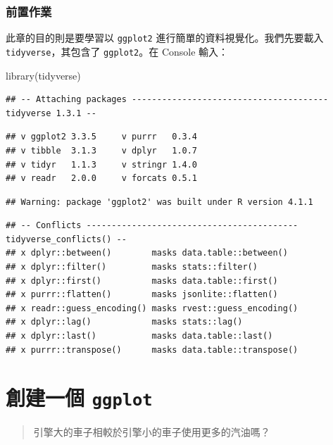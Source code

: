 \documentclass[
]{book}
\newenvironment{Shaded}{\begin{snugshade}}{\end{snugshade}}
\newcommand{\FunctionTok}[1]{\textcolor[rgb]{0.00,0.00,0.00}{#1}}
\newcommand{\NormalTok}[1]{#1}
\theoremstyle{definition}
\theoremstyle{remark}
\begin{document}
\hypertarget{ux524dux7f6eux4f5cux696d}{%
\subsubsection*{前置作業}\label{ux524dux7f6eux4f5cux696d}}

此章的目的則是要學習以 \texttt{ggplot2} 進行簡單的資料視覺化。我們先要載入 \texttt{tidyverse}，其包含了 \texttt{ggplot2}。在 Console 輸入：

\begin{Shaded}
\begin{Highlighting}[]
\FunctionTok{library}\NormalTok{(tidyverse)}
\end{Highlighting}
\end{Shaded}

\begin{verbatim}
## -- Attaching packages --------------------------------------- tidyverse 1.3.1 --
\end{verbatim}

\begin{verbatim}
## v ggplot2 3.3.5     v purrr   0.3.4
## v tibble  3.1.3     v dplyr   1.0.7
## v tidyr   1.1.3     v stringr 1.4.0
## v readr   2.0.0     v forcats 0.5.1
\end{verbatim}

\begin{verbatim}
## Warning: package 'ggplot2' was built under R version 4.1.1
\end{verbatim}

\begin{verbatim}
## -- Conflicts ------------------------------------------ tidyverse_conflicts() --
## x dplyr::between()        masks data.table::between()
## x dplyr::filter()         masks stats::filter()
## x dplyr::first()          masks data.table::first()
## x purrr::flatten()        masks jsonlite::flatten()
## x readr::guess_encoding() masks rvest::guess_encoding()
## x dplyr::lag()            masks stats::lag()
## x dplyr::last()           masks data.table::last()
## x purrr::transpose()      masks data.table::transpose()
\end{verbatim}

\hypertarget{create}{%
\section{\texorpdfstring{創建一個 \texttt{ggplot}}{創建一個 ggplot}}\label{create}}

\begin{quote}
引擎大的車子相較於引擎小的車子使用更多的汽油嗎？
\end{quote}
\end{document}
